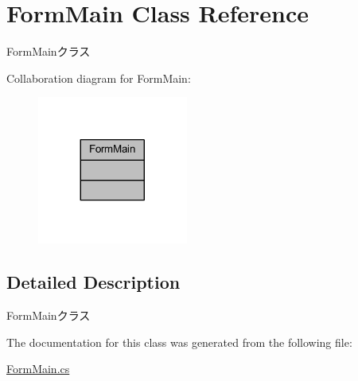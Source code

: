 \hypertarget{class_form_main}{}\section{Form\+Main Class Reference}
\label{class_form_main}


Form\+Mainクラス  




Collaboration diagram for Form\+Main\+:
\nopagebreak
\begin{figure}[H]
\begin{center}
\leavevmode
\includegraphics[width=140pt]{class_form_main__coll__graph}
\end{center}
\end{figure}


\subsection{Detailed Description}
Form\+Mainクラス 

The documentation for this class was generated from the following file\+:\begin{DoxyCompactItemize}
\item 
\hyperlink{_form_main_8cs}{Form\+Main.\+cs}\end{DoxyCompactItemize}
